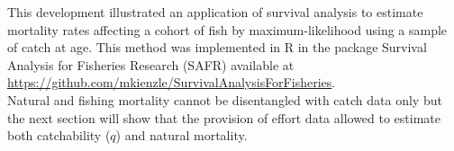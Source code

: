 
This development illustrated an application of survival analysis to estimate mortality rates affecting a cohort of fish by maximum-likelihood using a sample of catch at age. This method was implemented in R \citep{R} in the package Survival Analysis for Fisheries Research (SAFR) available at \url{https://github.com/mkienzle/SurvivalAnalysisForFisheries}. \\ %

Natural and fishing mortality cannot be disentangled with catch data only but the next section will show that the provision of effort data allowed to estimate both catchability ($q$) and natural mortality. 
